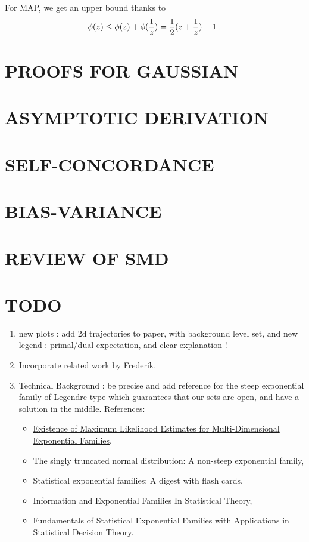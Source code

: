 \documentclass[twoside]{article}
\let\oldsection\section
\renewcommand{\section}[1]{\oldsection{\texorpdfstring{\uppercase{#1}}{#1}}}
\begin{document}
For MAP, we get an upper bound thanks to
\begin{align}
	\label{eq:log_bound}
	\phi(z) \leq \phi(z) + \phi(\frac{1}{z}) =  \frac{1}{2} (z + \frac{1}{z}) - 1 \; .
\end{align}

\section{PROOFS FOR GAUSSIAN}
\label{app:gaussian}

\section{ASYMPTOTIC DERIVATION}
\label{app:asymptote}

\section{SELF-CONCORDANCE}
\label{app:self-concordant}

\section{BIAS-VARIANCE}
\label{app:bias-variance}

\section{REVIEW OF SMD}
\label{app:SMD}

\section{TODO}
\begin{enumerate}
	\item new plots : add 2d trajectories to paper, with background level set, and new legend : primal/dual expectation, and clear explanation !
	\item Incorporate related work by Frederik.
	\item Technical Background : be precise and add reference for the steep exponential family of Legendre type which guarantees that our sets are open, and have a solution in the middle.
	References: \begin{itemize}
		\item \href{https://www.jstor.org/stable/4616462?seq=1#metadata_info_tab_contents}{Existence of Maximum Likelihood Estimates for Multi-Dimensional Exponential Families},
		\item The singly truncated normal distribution: A non-steep exponential family,
		\item Statistical exponential families: A digest with flash cards,
		\item Information and Exponential Families In Statistical Theory,
		\item Fundamentals of Statistical Exponential Families with Applications in Statistical Decision Theory.
	\end{itemize}
\end{enumerate}
\end{document}
